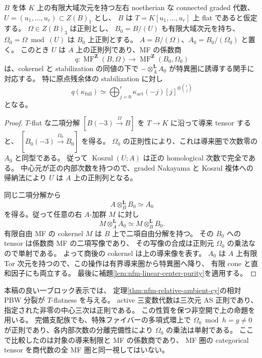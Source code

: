 \begin{proposition}[MF の係数商と残余体の導来制限]
\label{prop:nfm-mf-linear-restriction}
$B$ を体 $K$ 上の有限大域次元を持つ左右 noetherian な connected graded 代数、
$U=(u_1,\ldots,u_r)\subset Z(B)_1$ とし、
$B$ は $T=K[u_1,\ldots,u_r]$ 上 flat であると仮定する。
$\Omega\in Z(B)_3$ は正則とし、
$B_0=B/(U)$ も有限大域次元を持ち、
$\Omega_0=\Omega\bmod(U)$ は $B_0$ 上正則とする。
$A=B/(\Omega)$、$A_0=B_0/(\Omega_0)$ と置く。
このとき $U$ は $A$ 上の正則列であり、MF の係数商
\[
 q:\operatorname{MF}^{\mathbf Z}(B,\Omega)
      \longrightarrow\operatorname{MF}^{\mathbf Z}(B_0,\Omega_0)
\]
は、cokernel と stabilization の同値の下で
$-\otimes_A^{\mathbf L}A_0$ が特異圏に誘導する関手に対応する。
特に原点残余体の stabilization に対し
\begin{equation}
\label{eq:nfm-mf-linear-restriction}
 q(\kappa_{\mathrm{full}})
 \simeq
 \bigoplus_{j=0}^{r}
 \kappa_{\mathrm{act}}(-j)[j]^{\oplus\binom rj}
\end{equation}
となる。
\end{proposition}

\begin{proof}
$T$-flat な二項分解
$[B(-3)\xrightarrow{\Omega}B]$ を $T\to K$ に沿って導来 tensor すると、
$[B_0(-3)\xrightarrow{\Omega_0}B_0]$ を得る。
$\Omega_0$ の正則性により、これは導来圏で次数零の $A_0$ と同型である。
従って $\operatorname{Koszul}(U;A)$ は正の homological 次数で完全である。
中心元が正の内部次数を持つので、graded Nakayama と Koszul 複体への帰納法により
$U$ は $A$ 上の正則列となる。

同じ二項分解から
\[
 A\otimes_B^{\mathbf L}B_0\simeq A_0
\]
を得る。従って任意の右 $A$-加群 $M$ に対し
\[
 M\otimes_A^{\mathbf L}A_0
 \simeq M\otimes_B^{\mathbf L}B_0.
\]
有限自由 MF の cokernel $M$ は $B$ 上で二項自由分解を持つ。
その $B_0$ への tensor は係数商 MF の二項写像であり、
その写像の合成は正則元 $\Omega_0$ の乗法なので単射である。
よって商後の cokernel は上の導来像を表す。
$A_0$ は $A$ 上有限 Tor 次元を持つので、この操作は有界導来圏から特異圏へ降り、
有限 cone と直和因子にも両立する。
最後に補題\ref{lem:nfm-linear-center-purity}を適用する。
\end{proof}

本稿の良い一ブロック表示では、
定理\ref{thm:nfm-relative-ambient-cy}の相対 PBW 分裂が $T$-flatness を与える。
active 三変数代数は三次元 AS 正則であり、指定された非零の中心三次は正則である。
この性質を保つ非空開で上の命題を用いる。
完備支配族でも、特殊ファイバーの多項式環上で
$\Omega_0\bmod h=g\ne0$ が正則であり、各内部次数の分離完備性により
$\Omega_0$ の乗法は単射である。
ここで比較したのは対象の導来制限と MF の係数商であり、
MF 圏の categorical tensor を商代数の全 MF 圏と同一視してはいない。

